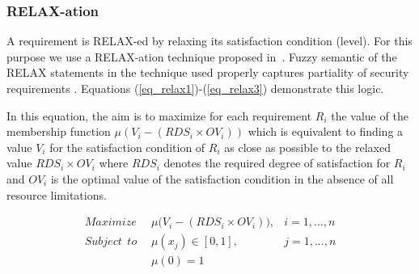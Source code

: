 \subsubsection{RELAX-ation}
\label{partial_relax}

A requirement is RELAX-ed by relaxing its satisfaction condition (level). For this purpose we use a RELAX-ation technique proposed in~\cite{whittle2010relax}. Fuzzy semantic of the RELAX statements in the technique used properly captures partiality of security requirements \cite{mougouei2013goal}. Equations (\ref{eq_relax1})-(\ref{eq_relax3}) demonstrate this logic. 

In this equation, the aim is to maximize for each requirement $R_i$ the value of the membership function $\mu(V_i - (RDS_i \times OV_i))$ which is equivalent to finding a value $V_i$ for the satisfaction condition of $R_i$ as close as possible to the relaxed value $RDS_i\times OV_i$ where $RDS_i$ denotes the required degree of satisfaction for $R_i$ and $OV_i$ is the optimal value of the satisfaction condition in the absence of all resource limitations. 



\begin{align}
\label{eq_relax1}
Maximize \phantom{s} &\mu \big(V_i - (RDS_i \times OV_i) \big),& i=1,...,n\\
\label{eq_relax2}
Subject\phantom{s}to\phantom{s} &\mu(x_j)\in [0,1], &j=1,...,n \\ 
\label{eq_relax3}
& \mu(0)= 1\\ \nonumber
\end{align}

